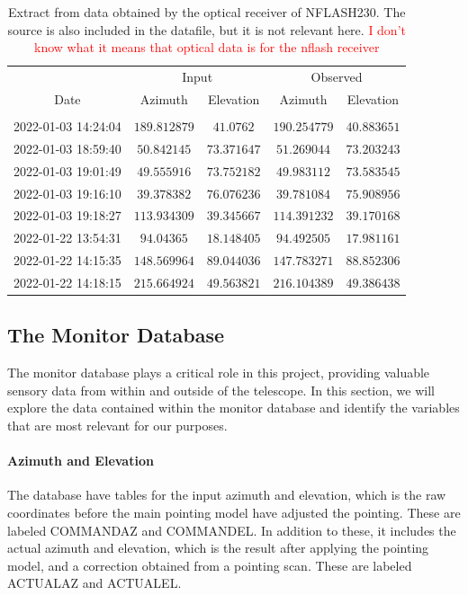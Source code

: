 \begin{table}[h]
    \centering
    \begin{tabular}{ccccc}
         & \multicolumn{2}{c}{Input} & \multicolumn{2}{c}{Observed} \\ 
        \cline{2-3} \cline{4-5}
        Date & Azimuth & Elevation & Azimuth & Elevation \\ 
        \hline \\
        2022-01-03 14:24:04 & $189.812879$ & $41.0762$ & $190.254779$ & $40.883651$ \\
        2022-01-03 18:59:40 & $50.842145$ & $73.371647$ & $51.269044$ & $73.203243$ \\
        2022-01-03 19:01:49 & $49.555916$ & $73.752182$ & $49.983112$ & $73.583545$ \\
        2022-01-03 19:16:10 & $39.378382$ & $76.076236$ & $39.781084$ & $75.908956$ \\
        2022-01-03 19:18:27 & $113.934309$ & $39.345667$ & $114.391232$ & $39.170168$ \\
        2022-01-22 13:54:31 & $94.04365$ & $18.148405$ & $94.492505$ & $17.981161$ \\
        2022-01-22 14:15:35 & $148.569964$ & $89.044036$ & $147.783271$ & $88.852306$ \\
        2022-01-22 14:18:15 & $215.664924$ & $49.563821$ & $216.104389$ & $49.386438$ \\
    \end{tabular}
    \caption{Extract from data obtained by the optical receiver of NFLASH230. The source is also included in the datafile, but it is not relevant here. \textcolor{red}{I don't know what it means that optical data is for the nflash receiver}}
    \label{tab:optical}
    \end{table}




\subsection{The Monitor Database}
The monitor database plays a critical role in this project, providing valuable sensory data from within and outside of the telescope.
In this section, we will explore the data contained within the monitor database and identify the variables that are most relevant for our purposes.

\paragraph{Azimuth and Elevation}
The database have tables for the input azimuth and elevation, which is the raw coordinates before the main pointing model have adjusted the pointing.
These are labeled COMMANDAZ and COMMANDEL.
In addition to these, it includes the actual azimuth and elevation, which is the result after applying the pointing model, and a correction obtained from a pointing scan.
These are labeled ACTUALAZ and ACTUALEL.

